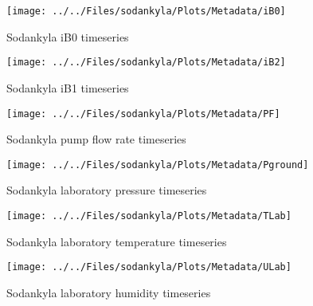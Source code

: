     \begin{figure}
        \centering
\texttt{[image: ../../Files/sodankyla/Plots/Metadata/iB0]}
    \caption{Sodankyla iB0 timeseries}
            \label{fig:iB0}
    \end{figure}

    \begin{figure}
        \centering
\texttt{[image: ../../Files/sodankyla/Plots/Metadata/iB2]}
    \caption{Sodankyla iB1 timeseries}
            \label{fig:iB1}
    \end{figure}

    \begin{figure}
        \centering
\texttt{[image: ../../Files/sodankyla/Plots/Metadata/PF]}
    \caption{Sodankyla pump flow rate timeseries}
            \label{fig:PF}
    \end{figure}

       \begin{figure}
        \centering
\texttt{[image: ../../Files/sodankyla/Plots/Metadata/Pground]}
    \caption{Sodankyla laboratory pressure timeseries}
            \label{fig:PLab}
    \end{figure}

           \begin{figure}
        \centering
\texttt{[image: ../../Files/sodankyla/Plots/Metadata/TLab]}
    \caption{Sodankyla laboratory temperature timeseries}
            \label{fig:TLab}
    \end{figure}

               \begin{figure}
        \centering
\texttt{[image: ../../Files/sodankyla/Plots/Metadata/ULab]}
    \caption{Sodankyla laboratory humidity timeseries}
            \label{fig:ULab}
    \end{figure}


